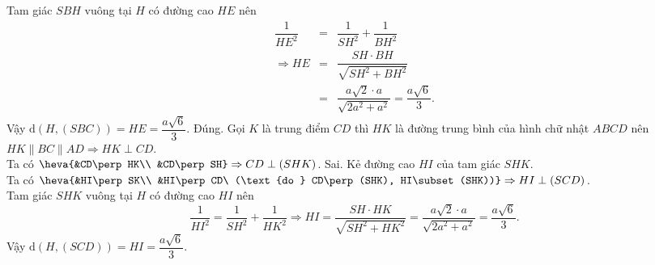 \begin{ex}
{\begin{itemchoice}
   Tam giác $SBH$ vuông tại $H$ có đường  cao $HE$ nên
   \begin{eqnarray*}
    \dfrac{1}{HE^2} &=&\dfrac{1}{SH^2}+\dfrac{1}{BH^2} \\ 
    \Rightarrow  HE&=&\dfrac{SH\cdot BH}{\sqrt{SH^2+BH^2}} \\
    &=&\dfrac{a \sqrt{2} \cdot  a}{\sqrt{2 a^2+a^2}}=\dfrac{a \sqrt{6}}{3}.
   \end{eqnarray*}
   Vậy $\mathrm{d}(H, (SBC))=HE=\dfrac{a  \sqrt{6}}{3}$.
   \itemch Đúng. Gọi $K$ là trung điểm $CD$ thì $HK$ là đường trung bình của hình chữ nhật $ABCD$  nên ${HK\parallel BC\parallel AD\Rightarrow HK\perp CD}$.\\
   Ta có ${\heva{&CD\perp HK\\  &CD\perp SH} \Rightarrow CD\perp(SHK)}$.
   \itemch  Sai. Kẻ đường cao $HI$ của tam giác $SHK$.\\
   Ta có  $\heva{&HI\perp SK\\ &HI\perp CD\ (\text{do } CD\perp(SHK), HI\subset(SHK))} \Rightarrow HI\perp(SCD)$.\\
    Tam giác $SHK$ vuông tại $H$ có đường cao $HI$ nên
   $$\dfrac{1}{HI^2}=\dfrac{1}{SH^2}+\dfrac{1}{HK^2} \Rightarrow HI=\dfrac{SH\cdot HK}{\sqrt{SH^2+HK^2}}=\dfrac{a \sqrt{2} \cdot  a}{\sqrt{2a^2+a^2}}=\dfrac{a \sqrt{6}}{3}.$$
   Vậy  $\mathrm{d}(H, (SCD))=HI=\dfrac{a \sqrt{6}}{3}$.
  \end{itemchoice}
 } 
\end{ex}


